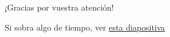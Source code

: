 \documentclass{beamer}
\begin{document}
	\subsection{}
	
	\begin{frame}
		\begin{block}{}
			\centering
			¡Gracias por vuestra atención!
		\end{block}
		\bigskip \bigskip \bigskip \bigskip
		\centering
		Si sobra algo de tiempo, ver \hyperlink{targetframe}{esta diapositiva}
	\end{frame}
\end{document}
